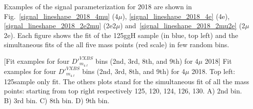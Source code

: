 Examples of the signal parameterization for 2018 are shown in 
Fig.~\ref{signal_lineshape_2018_4mu} (4$\mu$),
 \ref{signal_lineshape_2018_4e} (4e), 
 \ref{signal_lineshape_2018_2e2mu} (2e2$\mu$) and~\ref{signal_lineshape_2018_2mu2e} (2$\mu$2e). 
 Each figure shows the fit of the 125\GeV ggH sample (in blue, top left) and
the simultaneous fits of the all five mass points (red scale) in few random bins.
\begin{multiFigure}
\begin{center}
        [Fit examples for four $D'^{VXBS}_{m_{4\ell}}$ bins (2nd, 3rd, 8th, and 9th) 
        for 4$\mu$ 2018]
        {Fit examples for four $D'^{VXBS}_{m_{4\ell}}$ bins (2nd, 3rd, 8th, and 9th) for 4$\mu$ 2018.
        Top left: 125\GeV sample only fit. The others plots stand for the simultaneous fit of all the mass points:
        starting from top right respectively 125, 120, 124, 126, 130\GeV.
        \;A) 2nd bin.
        \;B) 3rd bin.
        \;C) 8th bin.
        \;D) 9th bin.
        }
\label{signal_lineshape_2018_4mu}
\end{center}
\end{multiFigure}

